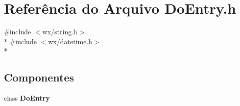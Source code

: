 \section{Referência do Arquivo Do\+Entry.\+h}
\label{_do_entry_8h}
{\ttfamily \#include $<$wx/string.\+h$>$}\\*
{\ttfamily \#include $<$wx/datetime.\+h$>$}\\*
\subsection*{Componentes}
\begin{DoxyCompactItemize}
\item 
class {\bf Do\+Entry}
\end{DoxyCompactItemize}
